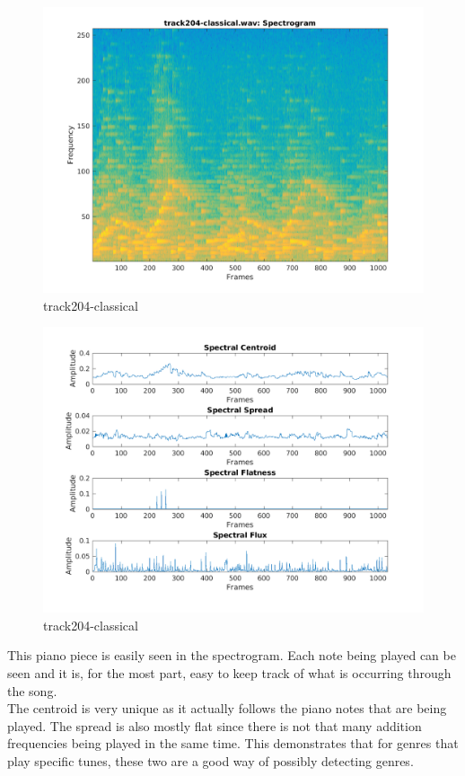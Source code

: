 \documentclass[11pt, a4paper]{article}
\begin{document}
\begin{figure}[H]
    \centering
    \includegraphics[width=.75\textwidth]{track204-classical-specto.png}
    \caption{track204-classical}
\end{figure}

\begin{figure}[H]
    \centering
    \includegraphics[width=\textwidth]{track204-classical-spectral.png}
    \caption{track204-classical}
\end{figure}

\pagebreak

This piano piece is easily seen in the spectrogram. Each note being played can be seen and it is, for the most part, easy to keep track of what is occurring through the song. \\

The centroid is very unique as it actually follows the piano notes that are being played. The spread is also mostly flat since there is not that many addition frequencies being played in the same time. This demonstrates that for genres that play specific tunes, these two are a good way of possibly detecting genres. \\
\end{document}
